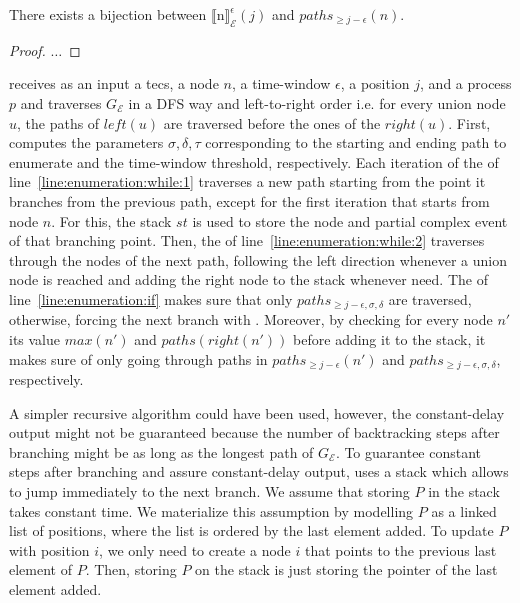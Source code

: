 \begin{theorem}\label{theorem:bijection_paths}
There exists a bijection between ${\llbracket \text{n} \rrbracket}^{\epsilon}_{\mathcal{E}}(j)$ and $paths_{\ge j - \epsilon}(n)$.
\end{theorem}

\begin{proof}
$\ldots$
\end{proof}

 receives as an input a \acrshort{tecs}, a node $n$, a time-window $\epsilon$, a position $j$, and a process $p$ and traverses $G_{\mathcal{E}}$ in a DFS way and left-to-right order i.e. for every union node $u$, the paths of $left(u)$ are traversed before the ones of the $right(u)$. First, computes the parameters $\sigma, \delta, \tau$ corresponding to the starting and ending path to enumerate and the time-window threshold, respectively. Each iteration of the  of line~\ref{line:enumeration:while:1} traverses a new path starting from the point it branches from the previous path, except for the first iteration that starts from node $n$. For this, the stack $st$ is used to store the node and partial complex event of that branching point. Then, the  of line~\ref{line:enumeration:while:2} traverses through the nodes of the next path, following the left direction whenever a union node is reached and adding the right node to the stack whenever need. The  of line~\ref{line:enumeration:if} makes sure that only $paths_{\ge j - \epsilon, \sigma, \delta}$ are traversed, otherwise, forcing the next branch with . Moreover, by checking for every node $n'$ its value $max(n')$ and $paths(right(n'))$ before adding it to the stack, it makes sure of only going through paths in $paths_{\ge j - \epsilon}(n')$ and $paths_{\ge j - \epsilon, \sigma, \delta}$, respectively.

A simpler recursive algorithm could have been used, however, the constant-delay output might not be guaranteed because the number of backtracking steps after branching might be as long as the longest path of $G_{\mathcal{E}}$. To guarantee constant steps after branching and assure constant-delay output,  uses a stack which allows to jump immediately to the next branch. We assume that storing $P$ in the stack takes constant time. We materialize this assumption by modelling $P$ as a linked list of positions, where the list is ordered by the last element added. To update $P$ with position $i$, we only need to create a node $i$ that points to the previous last element of $P$. Then, storing $P$ on the stack is just storing the pointer of the last element added.








